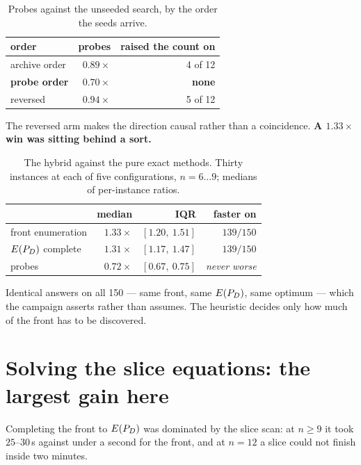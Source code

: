 \documentclass[11pt,a4paper]{article}
\begin{document}
\begin{table}[h]
\centering
\caption{Probes against the unseeded search, by the order the seeds arrive.}
\begin{tabular}{lrr}
\toprule
order & probes & raised the count on \\
\midrule
archive order        & $0.89\times$ & 4 of 12 \\
\textbf{probe order} & $\mathbf{0.70\times}$ & \textbf{none} \\
reversed             & $0.94\times$ & 5 of 12 \\
\bottomrule
\end{tabular}
\end{table}

\noindent
The reversed arm makes the direction causal rather than a coincidence.
\textbf{A $1.33\times$ win was sitting behind a sort.}

\begin{table}[h]
\centering
\caption{The hybrid against the pure exact methods.  Thirty instances at each
of five configurations, $n = 6 \dots 9$; medians of per-instance ratios.}
\begin{tabular}{lrrr}
\toprule
 & median & IQR & faster on \\
\midrule
front enumeration & $1.33\times$ & $[1.20,\ 1.51]$ & $139/150$ \\
$E(P_{D})$ complete     & $\mathbf{1.31\times}$ & $[1.17,\ 1.47]$ & $139/150$ \\
probes            & $0.72\times$ & $[0.67,\ 0.75]$ & \emph{never worse} \\
\bottomrule
\end{tabular}
\end{table}

\begin{center}
\end{center}

\noindent
Identical answers on all 150 --- same front, same $E(P_{D})$, same optimum --- which
the campaign asserts rather than assumes.  The heuristic decides only how much
of the front has to be discovered.

\section{Solving the slice equations: the largest gain here}

Completing the front to $E(P_{D})$ was dominated by the slice scan: at $n \geqslant 9$
it took $25$--$30$\,s against under a second for the front, and at $n = 12$ a
slice could not finish inside two minutes.
\end{document}
